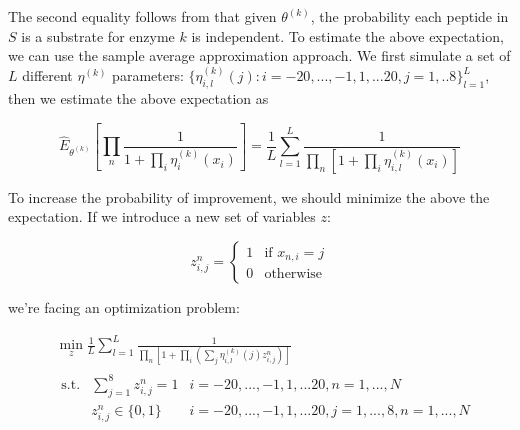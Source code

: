 \documentclass[12pt]{article}
\begin{document}
The second equality follows from that given $\theta^{(k)}$, the probability each peptide in $S$ is a substrate for enzyme $k$ is independent. To estimate the above expectation, we can use the sample average approximation approach. We first simulate a set of $L$ different $\eta^{(k)}$ parameters: $\{\eta_{i,l}^{(k)}(j):i=-20,...,-1,1,...20,j=1,..8\}_{l=1}^L$, then we estimate the above expectation as

\begin{equation*}
\hat{E}_{\theta^{(k)}}[\prod_n\frac{1}{1+\prod_i\eta_i^{(k)}(x_i)}] = \frac{1}{L}\sum_{l=1}^L\frac{1}{\prod_n[1+\prod_i\eta_{i,l}^{(k)}(x_i)]}
\end{equation*}

To increase the probability of improvement, we should minimize the above the expectation. If we introduce a new set of variables $z$:

\begin{equation*}
z_{i,j}^n =\left\{\begin{array}{ll} 1 & \textrm{if } x_{n,i}=j \\
                               0 & \textrm{otherwise} \end{array}\right.
\end{equation*}

we're facing an optimization problem:

\begin{align*}
&\min_z\frac{1}{L}\sum_{l=1}^L\frac{1}{\prod_n[1+\prod_i(\sum_j\eta_{i,l}^{(k)}(j)z_{i,j}^n)]} \\
&\begin{array}{lll}\textrm{s.t.}& \sum_{j=1}^8z^n_{i,j}=1 & i=-20,...,-1,1,...20,n=1,...,N\\
                                  & z^n_{i,j}\in\{0,1\} & i=-20,...,-1,1,...20,j=1,...,8,n=1,...,N\end{array}
\end{align*}


                             
\end{document}
